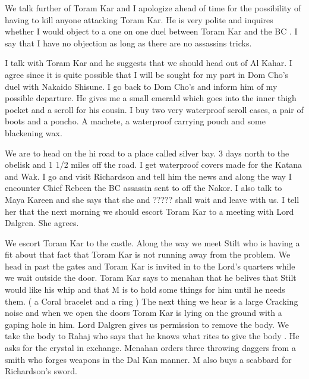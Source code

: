\documentclass[10pt]{report}
\begin{document}

We talk further of Toram Kar and I apologize ahead of time for the
possibility of having to kill anyone attacking Toram Kar. He is very
polite and inquires whether I would object to a one on one duel between
Toram Kar and the BC . I say that I have no objection as long as there are
no assassins tricks.

I talk with Toram Kar and he suggests that we should head out of Al Kahar.
I agree since it is quite possible that I will be sought for my part in
Dom Cho's duel with Nakaido Shisune. I go back to Dom Cho's and inform him
of my possible departure. He gives me a small emerald which goes into the
inner thigh pocket and a scroll for his cousin. I buy two very waterproof
scroll cases, a pair of boots and a poncho. A machete, a waterproof
carrying pouch and some blackening wax.

We are to head on the hi road to a place called silver bay. 3 days north
to the obelisk and 1 1/2 miles off the road. I get waterproof covers made
for the Katana and Wak. I go and visit Richardson and tell him the news
and along the way I encounter Chief Rebeen the BC assassin sent to off the
Nakor. I also talk to Maya Kareen and she says that she and ????? shall
wait and leave with us. I tell her that the next morning we should escort
Toram Kar to a meeting with Lord Dalgren. She agrees.

We escort Toram Kar to the castle. Along the way we meet Stilt who is
having a fit about that fact that Toram Kar is not running away from the
problem. We head in past the gates and Toram Kar is invited in to the
Lord's quarters while we wait outside the door. Toram Kar says to menahan
that he belives that Stilt would like his whip and that M is to hold some
things for him until he needs them. ( a Coral bracelet and a ring ) The
next thing we hear is a large Cracking noise and when we open the doors
Toram Kar is lying on the ground with a gaping hole in him. Lord Dalgren
gives us permission to remove the body. We take the body to Rahaj who says
that he knows what rites to give the body . He asks for the crystal in
exchange. Menahan orders three throwing daggers from a smith who forges
weapons in the Dal Kan manner. M also buys a scabbard for Richardson's
sword.
\end{document}
